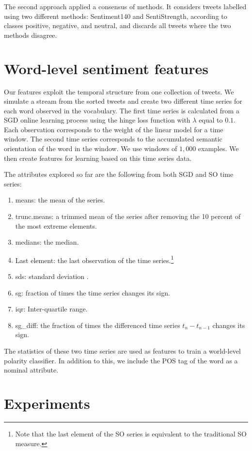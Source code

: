 \documentclass{sig-alternate}
\begin{document}
The second approach applied a consensus of methods. It considers tweets labelled using two different methods: Sentiment140 and SentiStrength, according to classes positive, negative, and neutral, and discards all tweets where the two methods disagree. 

\section{Word-level sentiment features}\label{sec:feat}

Our features exploit the temporal structure from one collection of tweets. We simulate a stream from the sorted tweets and create two different time series for each word observed in the vocabulary. The first time series is calculated from a SGD online learning process using the hinge loss function with $\lambda$ equal to $0.1$. Each observation corresponds to the weight of the linear model for a time window.  The second time series corresponds to the accumulated semantic orientation of the word in the window. We use windows of $1,000$ examples. We then create features for learning based on this time series data.

The attributes explored so far are the following from both SGD and SO time series:
\begin{enumerate}
\item means: the mean of the series.
\item trunc.means: a trimmed mean of the series after removing the 10 percent of the most extreme elements.
\item medians: the median.
\item Last element: the last observation of the time series.\footnote{Note that the last element of the SO series is equivalent to the traditional SO measure.}
\item sds: standard deviation .
\item sg: fraction of times the time series changes its sign.
\item iqr: Inter-quartile range.
\item sg\_diff: the fraction of times the differenced time series $t_n - t_{n-1}$ changes its sign.

\end{enumerate}
The statistics of these two time series are used as features to train a world-level polarity classifier. In addition to this, we include the POS tag of the word as a nominal attribute.


\section{Experiments}\label{sec:experiments}
\end{document}
